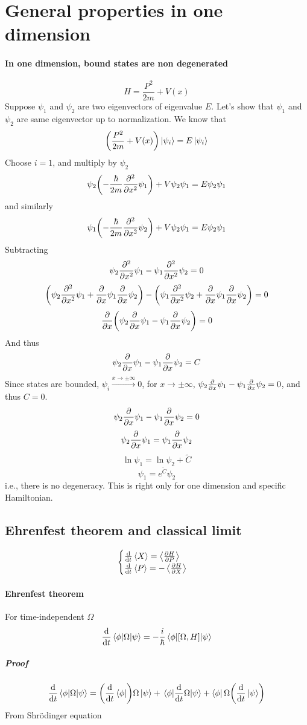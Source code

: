 \section{General properties in one dimension}
\paragraph{In one dimension, bound states are non degenerated}
$$H = \frac{P^2}{2m} + V(x)$$
Suppose $\psi_1$ and $\psi_2$ are two eigenvectors of eigenvalue $E$. Let's show that $\psi_1$ and $\psi_2$ are same eigenvector up to normalization. We know that
$$\qty(\frac{P^2}{2m} + V(x)) \ket{\psi_i} = E \ket{\psi_i}$$
Choose $i=1$, and multiply by $\psi_2$
$$\psi_2\qty(-\frac{\hbar}{2m}\pdv[2]{x}\psi_1) + V\psi_2\psi_1 = E\psi_2\psi_1$$
and similarly
$$\psi_1\qty(-\frac{\hbar}{2m}\pdv[2]{x}\psi_2) + V\psi_2\psi_1 = E\psi_2\psi_1$$
Subtracting 
$$\psi_2 \pdv[2]{x} \psi_1 - \psi_1 \pdv[2]{x} \psi_2 = 0$$
$$\qty(\psi_2 \pdv[2]{x} \psi_1 + \pdv{x}\psi_1\pdv{x}\psi_2) - \qty(\psi_1 \pdv[2]{x} \psi_2 + \pdv{x}\psi_1\pdv{x}\psi_2)= 0$$
$$\pdv{x} \qty(\psi_2\pdv{x}\psi_1 - \psi_1\pdv{x}\psi_2) = 0$$
And thus
$$\psi_2\pdv{x}\psi_1 - \psi_1\pdv{x}\psi_2 = C$$
Since states are bounded, $\psi_i \stackrel{x\to \pm \infty}{\longrightarrow} 0$, for $x\to \pm \infty$, $\psi_2\pdv{x}\psi_1 - \psi_1\pdv{x}\psi_2 =0$, and thus $C=0$.
$$\psi_2\pdv{x}\psi_1 - \psi_1\pdv{x}\psi_2 = 0$$
$$\psi_2\pdv{x}\psi_1 = \psi_1\pdv{x}\psi_2 $$
$$\ln \psi_1 = \ln \psi_2 + \tilde{C} $$
$$\psi_1 =  e^{\tilde{C}} \psi_2 $$
i.e., there is no degeneracy. This is right only for one dimension and specific Hamiltonian.
\subsection{Ehrenfest theorem and classical limit}
$$\begin{cases}
\dv{t} \expval{X} = \expval{\pdv{H}{P}}\\
\dv{t} \expval{P} = -\expval{\pdv{H}{X}}\\
\end{cases}$$
\paragraph{Ehrenfest theorem}
For time-independent $\Omega$ 
$$\dv{t} \mel{\phi}{\Omega}{\psi} = -\frac{i}{\hbar} \mel{\phi}{\comm{\Omega}{H}}{\psi}$$
\subparagraph{Proof}
$$\dv{t} \mel{\phi}{\Omega}{\psi}  = \qty(\dv{t} \bra{\phi}) \Omega \ket{\psi} + \mel{\phi}{\dv{t}\Omega}{\psi} +  \bra{\phi} \Omega \qty(\dv{t}\ket{\psi})$$
From Shr\"{o}dinger equation

